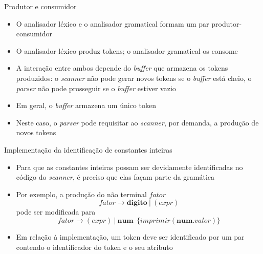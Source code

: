 \begin{frame}[fragile]{Produtor e consumidor}

    \begin{itemize}
        \item O analisador léxico e o analisador gramatical formam um par produtor-consumidor
        \pause

        \item O analisador léxico produz tokens; o analisador gramatical os consome
        \pause

        \item A interação entre ambos depende do \textit{buffer} que armazena os tokens produzidos: o \textit{scanner} não pode gerar novos tokens se o
            \textit{buffer} está cheio, o \textit{parser} não pode prosseguir se o \textit{buffer} estiver vazio
        \pause

        \item Em geral, o \textit{buffer} armazena um único token
        \pause

        \item Neste caso, o \textit{parser} pode requisitar ao \textit{scanner}, por demanda, a produção de novos tokens
    \end{itemize}

\end{frame}

\begin{frame}[fragile]{Implementação da identificação de constantes inteiras}

    \begin{itemize}
        \item Para que as constantes inteiras possam ser devidamente identificadas no código do \textit{scanner}, é preciso que elas façam parte da
            gramática
        \pause

        \item Por exemplo, a produção do não terminal $fator$ 
        \[
            fator \to \mathbf{digito}\ |\ (expr)
        \]
        pode ser modificada para
        \[
            fator \to (expr)\ |\ \mathbf{num}\ \ \{imprimir(\mathbf{num}.valor)\}
        \]
        \pause

        \item Em relação à implementação, um token deve ser identificado por um par contendo o identificador do token e o seu atributo
    \end{itemize}

\end{frame}

